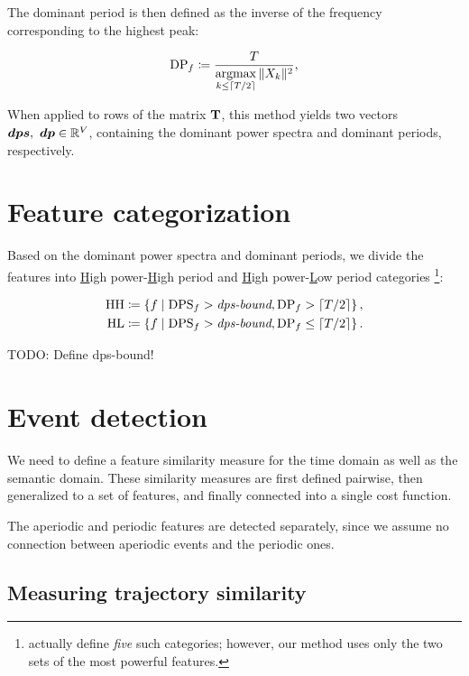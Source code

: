 The dominant period is then defined as the inverse of the frequency corresponding to the highest peak:

\begin{equation}
	\text{DP}_{f} \coloneqq \frac{T}{\operatorname*{argmax}\limits_{k \leq \lceil T / 2\rceil}{\|X_{k}\|^{2}}},
\end{equation}

When applied to rows of the matrix $\mathbf{T}$, this method yields two vectors $\vect{DPS},\ \vect{DP} \in \R^{\featcount}$, containing the dominant power spectra and dominant periods, respectively.


\section{Feature categorization}
Based on the dominant power spectra and dominant periods, we divide the features into \underline{H}igh power-\underline{H}igh period and \underline{H}igh power-\underline{L}ow period categories \footnote{\cite{event-detection} actually define \textit{five} such categories; however, our method uses only the two sets of the most powerful features.}:

\begin{equation}
\begin{split}
	\text{HH} \coloneqq \left\{ f \mid \text{DPS}_{f} > \textit{dps-bound}, \text{DP}_{f} > \lceil T / 2\rceil \right\}, \\
	\text{HL} \coloneqq \left\{ f \mid \text{DPS}_{f} > \textit{dps-bound}, \text{DP}_{f} \leq \lceil T / 2\rceil \right\}.
\end{split}
\end{equation}

{\color{red}TODO: Define dps-bound!}


\section{Event detection}
We need to define a feature similarity measure for the time domain as well as the semantic domain. These similarity measures are first defined pairwise, then generalized to a set of features, and finally connected into a single cost function.

The aperiodic and periodic features are detected separately, since we assume no connection between aperiodic events and the periodic ones.


\subsection{Measuring trajectory similarity}

